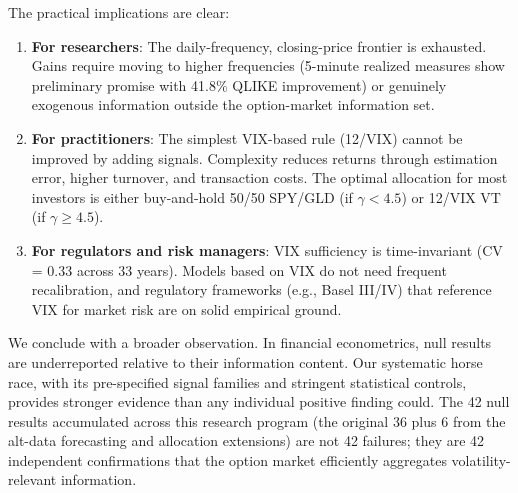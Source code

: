 \documentclass[12pt,a4paper]{article}
\begin{document}
The practical implications are clear:

\begin{enumerate}
    \item \textbf{For researchers}: The daily-frequency, closing-price frontier is exhausted. Gains require moving to higher frequencies (5-minute realized measures show preliminary promise with 41.8\% QLIKE improvement) or genuinely exogenous information outside the option-market information set.

    \item \textbf{For practitioners}: The simplest VIX-based rule (12/VIX) cannot be improved by adding signals. Complexity reduces returns through estimation error, higher turnover, and transaction costs. The optimal allocation for most investors is either buy-and-hold 50/50 SPY/GLD (if $\gamma < 4.5$) or 12/VIX VT (if $\gamma \geq 4.5$).

    \item \textbf{For regulators and risk managers}: VIX sufficiency is time-invariant (CV = 0.33 across 33 years). Models based on VIX do not need frequent recalibration, and regulatory frameworks (e.g., Basel III/IV) that reference VIX for market risk are on solid empirical ground.
\end{enumerate}

We conclude with a broader observation. In financial econometrics, null results are underreported relative to their information content. Our systematic horse race, with its pre-specified signal families and stringent statistical controls, provides stronger evidence than any individual positive finding could. The 42 null results accumulated across this research program (the original 36 plus 6 from the alt-data forecasting and allocation extensions) are not 42 failures; they are 42 independent confirmations that the option market efficiently aggregates volatility-relevant information.


\end{document}
